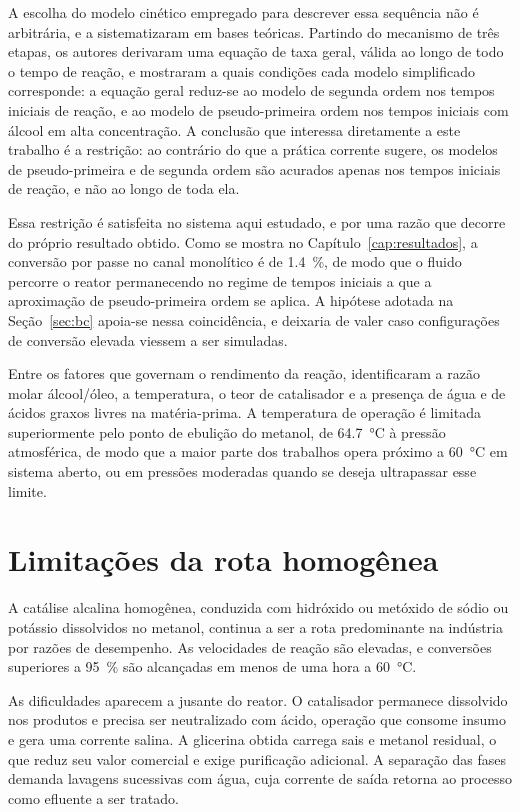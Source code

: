 A escolha do modelo cinético empregado para descrever essa sequência não é
arbitrária, e \textcite{Ezzati2021} a sistematizaram em bases teóricas. Partindo
do mecanismo de três etapas, os autores derivaram uma equação de taxa geral,
válida ao longo de todo o tempo de reação, e mostraram a quais condições cada
modelo simplificado corresponde: a equação geral reduz-se ao modelo de segunda
ordem nos tempos iniciais de reação, e ao modelo de pseudo-primeira ordem nos
tempos iniciais com álcool em alta concentração. A conclusão que interessa
diretamente a este trabalho é a restrição: ao contrário do que a prática
corrente sugere, os modelos de pseudo-primeira e de segunda ordem são acurados
apenas nos tempos iniciais de reação, e não ao longo de toda ela.

Essa restrição é satisfeita no sistema aqui estudado, e por uma razão que
decorre do próprio resultado obtido. Como se mostra no
Capítulo~\ref{cap:resultados}, a conversão por passe no canal monolítico é de
\SI{1.4}{\percent}, de modo que o fluido percorre o reator permanecendo no
regime de tempos iniciais a que a aproximação de pseudo-primeira ordem se
aplica. A hipótese adotada na Seção~\ref{sec:bc} apoia-se nessa coincidência, e
deixaria de valer caso configurações de conversão elevada viessem a ser
simuladas.

Entre os fatores que governam o rendimento da reação, \textcite{Freedman1986}
identificaram a razão molar álcool/óleo, a temperatura, o teor de catalisador e
a presença de água e de ácidos graxos livres na matéria-prima. A temperatura de
operação é limitada superiormente pelo ponto de ebulição do metanol, de
\SI{64.7}{\celsius} à pressão atmosférica, de modo que a maior parte dos
trabalhos opera próximo a \SI{60}{\celsius} em sistema aberto, ou em pressões
moderadas quando se deseja ultrapassar esse limite.

\section{Limitações da rota homogênea}

A catálise alcalina homogênea, conduzida com hidróxido ou metóxido de sódio ou
potássio dissolvidos no metanol, continua a ser a rota predominante na indústria
por razões de desempenho. As velocidades de reação são elevadas, e conversões
superiores a \SI{95}{\percent} são alcançadas em menos de uma hora a
\SI{60}{\celsius}.

As dificuldades aparecem a jusante do reator. O catalisador permanece dissolvido
nos produtos e precisa ser neutralizado com ácido, operação que consome insumo e
gera uma corrente salina. A glicerina obtida carrega sais e metanol residual, o
que reduz seu valor comercial e exige purificação adicional. A separação das
fases demanda lavagens sucessivas com água, cuja corrente de saída retorna ao
processo como efluente a ser tratado.

